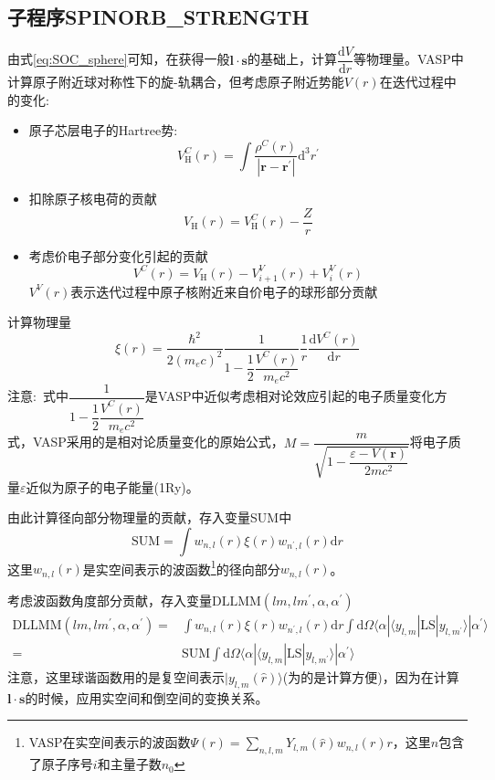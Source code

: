 \documentclass[10pt, oneside, a4paper]{article}      %
\begin{document}
\subsection{子程序\bf{SPINORB\_STRENGTH}}
由式\eqref{eq:SOC_sphere}可知，在获得一般$\mathbf{l}\cdot\mathbf{s}$的基础上，计算$\dfrac{\mathrm{d}V}{\mathrm{d}r}$等物理量。\textrm{VASP}中计算原子附近球对称性下的旋-轨耦合，但考虑原子附近势能$V(r)$在迭代过程中的变化:
\begin{itemize}
	\item 原子芯层电子的\textrm{Hartree}势:
		\begin{displaymath}
			V_{\mathrm{H}}^C(r)=\int\dfrac{\rho^C(r)}{|\mathbf{r}-\mathbf{r^{\prime}}|}\mathrm{d}^3r^{\prime}
		\end{displaymath}
	\item 扣除原子核电荷的贡献
		\begin{displaymath}
			V_{\mathrm{H}}(r)=V_{\mathrm{H}}^C(r)-\dfrac{Z}r
		\end{displaymath}
	\item 考虑价电子部分变化引起的贡献
		\begin{displaymath}
			V^C(r)=V_{\mathrm{H}}(r)-V_{i+1}^{V}(r)+V_{i}^{V}(r)
		\end{displaymath}
$V^V(r)$表示迭代过程中原子核附近来自价电子的球形部分贡献
\end{itemize}
计算物理量
\begin{displaymath}
	\xi(r)=\dfrac{\hbar^2}{2(m_ec)^2}\dfrac1{1-\dfrac12\dfrac{V^C(r)}{m_ec^2}}\dfrac1r\dfrac{\mathrm{d}V^C(r)}{\mathrm{d}r}
\end{displaymath}
注意:~式中$\dfrac1{1-\dfrac12\dfrac{V^C(r)}{m_ec^2}}$是\textrm{VASP}中近似考虑相对论效应引起的电子质量变化方式，\textrm{VASP}采用的是相对论质量变化的原始公式，$M=\dfrac m{\sqrt{1-\dfrac{\varepsilon-V(\mathbf{r})}{2mc^2}}}$将电子质量$\varepsilon$近似为原子的电子能量(1\textrm{Ry})。

由此计算径向部分物理量的贡献，存入变量\textrm{SUM}中
\begin{displaymath}
	\mathrm{SUM}=\int w_{n,l}(r)\xi(r)w_{n^{\prime},l}(r)\mathrm{d}r
\end{displaymath}
这里$w_{n,l}(r)$是实空间表示的波函数\footnote{\textrm{VASP}在实空间表示的波函数$\Psi(r)=\sum\limits_{n,l,m}Y_{l,m}(\hat{r})w_{n,l}(r)r$，这里$n$包含了原子序号$i$和主量子数$n_0$}的径向部分$w_{n,l}(r)$。

考虑波函数角度部分贡献，存入变量$\mathrm{DLLMM}(lm,lm^{\prime},\alpha,\alpha^{\prime})$
\begin{displaymath}
	\begin{aligned}
		\mathrm{DLLMM}(lm,lm^{\prime},\alpha,\alpha^{\prime})=&\int w_{n,l}(r)\xi(r)w_{n^{\prime},l}(r)\mathrm{d}r\int\mathrm{d}\Omega\langle\alpha|\langle y_{l,m}|\mathrm{LS}|y_{l,m^{\prime}}\rangle|\alpha^{\prime}\rangle\\
		=&\mathrm{SUM}\int\mathrm{d}\Omega\langle\alpha|\langle y_{l,m}|\mathrm{LS}|y_{l,m^{\prime}}\rangle|\alpha^{\prime}\rangle
	\end{aligned}
\end{displaymath}
注意，这里球谐函数用的是复空间表示$|y_{l,m}(\hat r)\rangle$(为的是计算方便)，因为在计算$\mathbf{l}\cdot\mathbf{s}$的时候，应用实空间和倒空间的变换关系。
\end{document}
